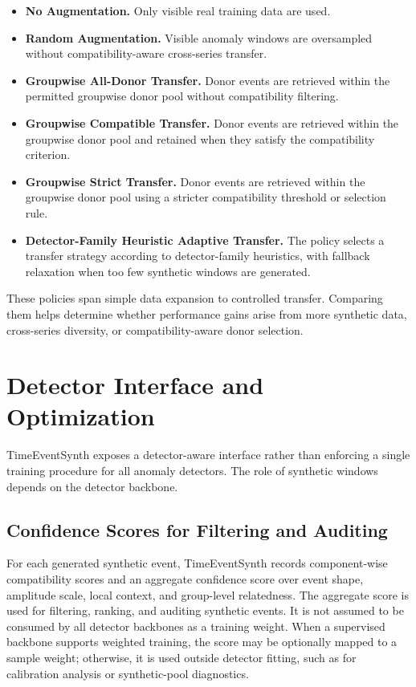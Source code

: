 \documentclass[conference]{IEEEtran}
\begin{document}
\begin{itemize}
    \item \textbf{No Augmentation.}
    Only visible real training data are used.

    \item \textbf{Random Augmentation.}
    Visible anomaly windows are oversampled without compatibility-aware
    cross-series transfer.

    \item \textbf{Groupwise All-Donor Transfer.}
    Donor events are retrieved within the permitted groupwise donor pool
    without compatibility filtering.

    \item \textbf{Groupwise Compatible Transfer.}
    Donor events are retrieved within the groupwise donor pool and retained
    when they satisfy the compatibility criterion.

    \item \textbf{Groupwise Strict Transfer.}
    Donor events are retrieved within the groupwise donor pool using a stricter
    compatibility threshold or selection rule.

    \item \textbf{Detector-Family Heuristic Adaptive Transfer.}
    The policy selects a transfer strategy according to detector-family
    heuristics, with fallback relaxation when too few synthetic windows are
    generated.
\end{itemize}

These policies span simple data expansion to controlled transfer. Comparing them helps determine whether performance gains arise from more synthetic data, cross-series diversity, or compatibility-aware donor selection.

\section{Detector Interface and Optimization}
\label{sec:detector_interface}

TimeEventSynth exposes a detector-aware interface rather than enforcing a
single training procedure for all anomaly detectors. The role of synthetic
windows depends on the detector backbone.

\subsection{Confidence Scores for Filtering and Auditing}

For each generated synthetic event, TimeEventSynth records component-wise compatibility scores and an aggregate confidence score over event shape, amplitude scale, local context, and group-level relatedness. The aggregate score is used for filtering, ranking, and auditing synthetic events. It is not assumed to be consumed by all detector backbones as a training weight. When a supervised backbone supports weighted training, the score may be optionally mapped to a sample weight; otherwise, it is used outside detector fitting, such as for calibration analysis or synthetic-pool diagnostics.
\end{document}
